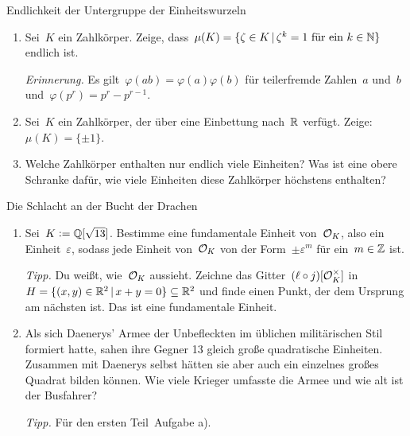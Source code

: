 \documentclass{uebblatt}
\begin{document}

\begin{aufgabe}{Endlichkeit der Untergruppe der Einheitswurzeln}
\begin{enumerate}
\item Sei~$K$ ein Zahlkörper. Zeige, dass~$\mu(K) = \{ \zeta \in K \,|\,
\text{$\zeta^k = 1$ für ein~$k \in \mathbb{N}$} \}$ endlich ist.

{\tiny\emph{Erinnerung.} Es gilt~$\varphi(ab) = \varphi(a) \varphi(b)$ für
teilerfremde Zahlen~$a$ und~$b$ und~$\varphi(p^r) = p^r - p^{r-1}$.\par}

\item Sei~$K$ ein Zahlkörper, der über eine Einbettung nach~$\mathbb{R}$ verfügt.
Zeige: $\mu(K) = \{ \pm1 \}$.

\item Welche Zahlkörper enthalten nur endlich viele Einheiten? Was ist eine
obere Schranke dafür, wie viele Einheiten diese Zahlkörper höchstens enthalten?
\end{enumerate}
\end{aufgabe}

\begin{aufgabe}{Die Schlacht an der Bucht der Drachen}
\begin{enumerate}
\item Sei~$K \vcentcolon= \mathbb{Q}[\sqrt{13}]$. Bestimme eine fundamentale Einheit
von~$\mathcal{O}_K$, also ein Einheit~$\varepsilon$, sodass jede Einheit von~$\mathcal{O}_K$ von der
Form~$\pm \varepsilon^m$ für ein~$m \in \mathbb{Z}$ ist.

{\tiny\emph{Tipp.} Du weißt, wie~$\mathcal{O}_K$ aussieht. Zeichne das
Gitter~$(\ell \circ j)[\mathcal{O}_K^\times]$ in~$H = \{ (x,y) \in \mathbb{R}^2 \,|\, x + y = 0
\} \subseteq \mathbb{R}^2$ und
finde einen Punkt, der dem Ursprung am nächsten ist. Das ist eine fundamentale
Einheit.\par}

\item Als sich Daenerys' Armee der Unbefleckten im üblichen militärischen Stil
formiert hatte, sahen ihre Gegner 13 gleich große quadratische Einheiten.
Zusammen mit Daenerys selbst hätten sie aber auch ein einzelnes großes Quadrat
bilden können. Wie viele Krieger umfasste die Armee und wie alt ist der
Busfahrer?

{\tiny\emph{Tipp.} Für den ersten Teil~Aufgabe a).\par}
\end{enumerate}
\end{aufgabe}
\end{document}
